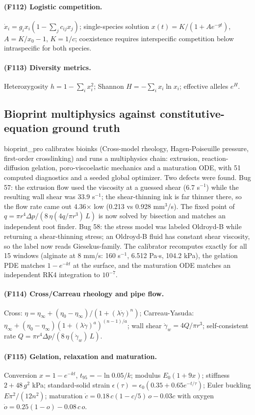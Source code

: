 \paragraph{(F112) Logistic competition.} $\dot x_i=g_i x_i(1-\sum_j c_{ij}x_j)$; single-species solution $x(t)=K/(1+A e^{-gt})$, $A=K/x_0-1$, $K=1/c$; coexistence requires interspecific competition below intraspecific for both species.
\paragraph{(F113) Diversity metrics.} Heterozygosity $h=1-\sum_i x_i^2$; Shannon $H=-\sum_i x_i\ln x_i$; effective alleles $e^{H}$.
\subsection{Bioprint multiphysics against constitutive-equation ground truth}
bioprint\_pro calibrates bioinks (Cross-model rheology, Hagen-Poiseuille pressure, first-order crosslinking) and runs a multiphysics chain: extrusion, reaction-diffusion gelation, poro-viscoelastic mechanics and a maturation ODE, with 51 computed diagnostics and a seeded global optimizer. Two defects were found. Bug 57: the extrusion flow used the viscosity at a guessed shear (6.7 s$^{-1}$) while the resulting wall shear was 33.9 s$^{-1}$; the shear-thinning ink is far thinner there, so the flow rate came out 4.36$\times$ low (0.213 vs 0.928 mm$^3$/s). The fixed point of $q=\pi r^4\Delta p/(8\,\eta(4q/\pi r^3)\,L)$ is now solved by bisection and matches an independent root finder. Bug 58: the stress model was labeled Oldroyd-B while returning a shear-thinning stress; an Oldroyd-B fluid has constant shear viscosity, so the label now reads Giesekus-family. The calibrator recomputes exactly for all 15 windows (alginate at 8 mm/s: 160 s$^{-1}$, 6.512 Pa$\cdot$s, 104.2 kPa), the gelation PDE matches $1-e^{-kt}$ at the surface, and the maturation ODE matches an independent RK4 integration to $10^{-7}$.
\paragraph{(F114) Cross/Carreau rheology and pipe flow.} Cross: $\eta=\eta_\infty+(\eta_0-\eta_\infty)/(1+(\lambda\dot\gamma)^n)$; Carreau-Yasuda: $\eta_\infty+(\eta_0-\eta_\infty)(1+(\lambda\dot\gamma)^a)^{(n-1)/a}$; wall shear $\dot\gamma_w=4Q/\pi r^3$; self-consistent rate $Q=\pi r^4\Delta p/(8\,\eta(\dot\gamma_w)\,L)$.
\paragraph{(F115) Gelation, relaxation and maturation.} Conversion $x=1-e^{-kt}$, $t_{95}=-\ln0.05/k$; modulus $E_0(1+9x)$; stiffness $2+48\,g^2$ kPa; standard-solid strain $\epsilon(\tau)=\epsilon_0(0.35+0.65e^{-t/\tau})$; Euler buckling $E\pi^2/(12n^2)$; maturation $\dot c=0.18\,c(1-c/5)\,o-0.03c$ with oxygen $\dot o=0.25(1-o)-0.08\,c\,o$.
